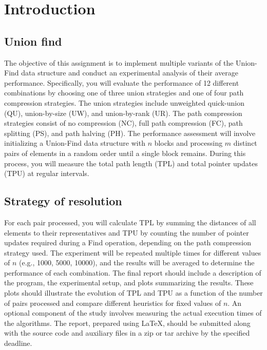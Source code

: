 \documentclass[10pt,a4paper,hidelinks]{article}
\begin{document}

\tableofcontents

\section{Introduction}
\subsection{Union find}
The objective of this assignment is to implement multiple variants of the Union-Find data structure and conduct an experimental analysis of their average performance. Specifically, you will evaluate the performance of 12 different combinations by choosing one of three union strategies and one of four path compression strategies. The union strategies include unweighted quick-union (QU), union-by-size (UW), and union-by-rank (UR). The path compression strategies consist of no compression (NC), full path compression (FC), path splitting (PS), and path halving (PH). The performance assessment will involve initializing a Union-Find data structure with $n$ blocks and processing $m$ distinct pairs of elements in a random order until a single block remains. During this process, you will measure the total path length (TPL) and total pointer updates (TPU) at regular intervals.

\subsection{Strategy of resolution}
For each pair processed, you will calculate TPL by summing the distances of all elements to their representatives and TPU by counting the number of pointer updates required during a Find operation, depending on the path compression strategy used. The experiment will be repeated multiple times for different values of $n$ (e.g., 1000, 5000, 10000), and the results will be averaged to determine the performance of each combination. The final report should include a description of the program, the experimental setup, and plots summarizing the results. These plots should illustrate the evolution of TPL and TPU as a function of the number of pairs processed and compare different heuristics for fixed values of $n$. An optional component of the study involves measuring the actual execution times of the algorithms. The report, prepared using \LaTeX, should be submitted along with the source code and auxiliary files in a zip or tar archive by the specified deadline.\\
\end{document}
